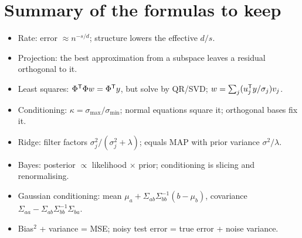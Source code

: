 \section*{Summary of the formulas to keep}
\begin{itemize}[nosep]
  \item Rate: error $\approx n^{-s/d}$; structure lowers the effective $d/s$.
  \item Projection: the best approximation from a subspace leaves a residual orthogonal to it.
  \item Least squares: $\Phi^{\mathsf{T}}\Phi w = \Phi^{\mathsf{T}} y$, but solve by QR/SVD; $w = \sum_j (u_j^{\mathsf{T}} y/\sigma_j) v_j$.
  \item Conditioning: $\kappa = \sigma_{\max}/\sigma_{\min}$; normal equations square it; orthogonal bases fix it.
  \item Ridge: filter factors $\sigma_j^2/(\sigma_j^2 + \lambda)$; equals MAP with prior variance $\sigma^2/\lambda$.
  \item Bayes: posterior $\propto$ likelihood $\times$ prior; conditioning is slicing and renormalising.
  \item Gaussian conditioning: mean $\mu_a + \Sigma_{ab}\Sigma_{bb}^{-1}(b-\mu_b)$, covariance
        $\Sigma_{aa} - \Sigma_{ab}\Sigma_{bb}^{-1}\Sigma_{ba}$.
  \item Bias$^2$ + variance = MSE; noisy test error = true error + noise variance.
\end{itemize}
